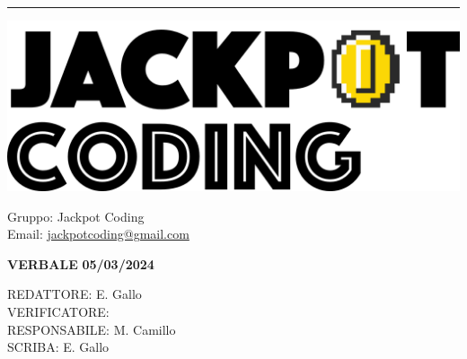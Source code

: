 \documentclass[5pt]{article}
\begin{document}
\hrule
\begin{minipage}[t]{0.50\textwidth}
    \begin{flushleft}
        \hspace{10pt}
        \includegraphics[scale=0.65]{jackpot-logo.png} 
    \end{flushleft}
\end{minipage}
\hspace{-60pt} %
\begin{flushright}
    \begin{minipage}[t]{0.50\textwidth}
        \begin{flushright}
            Gruppo: {\Large Jackpot Coding}\\
            Email: \href{mailto:jackpotcoding@gmail.com}{jackpotcoding@gmail.com}
        \end{flushright}
    \end{minipage}
\end{flushright}

\vspace{15pt}

\begin{center}
    \textbf{\large VERBALE }
    \textbf{\large 05/03/2024} \\
    \textbf{\Large}
\end{center}

\vspace{13pt}

\begin{flushleft}
    \begin{spacing}{1.5}
        REDATTORE:  E. Gallo \\
        VERIFICATORE:  \\%
        RESPONSABILE: M. Camillo \\%
        \vspace{7pt}
        SCRIBA: E. Gallo\\%
    \end{spacing}
\end{flushleft}
\end{document}
